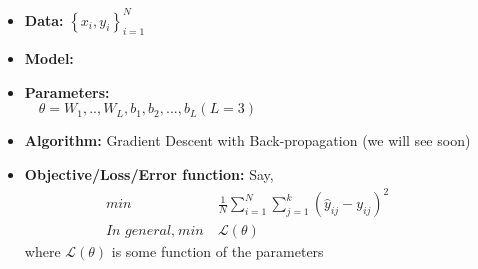 \begin{frame}
  \begin{columns}
    \begin{overlayarea}{\textwidth}{\textheight}
      \makebox[\textwidth][c]{\usebox{\nncontent}}
    \end{overlayarea}

      \begin{itemize}
        \justifying
        \item <1-> \textbf{Data:} $\left\{ x_{i},y_{i} \right\}_{i=1}^{N}$
        \item <2-> \textbf{Model:} 
            \vspace{-0.1in}
        \item <4-> \textbf{Parameters:} \\ $\quad \theta = {W_{1}, .., W_{L}, b_1, b_2, ... , b_L} (L =3)$
        \item <5-> \textbf{Algorithm:} Gradient Descent with Back-propagation (we will see soon)
        \item <6-> \textbf{Objective/Loss/Error function:} Say,
            \vspace{-0.1in}
            \begin{align*}
              min                        & ~ \frac{1}{N} \sum_{i=1}^{N} \sum_{j=1}^{k} (\hat y_{ij} - y_{ij})^{2} \\
              \textit{In general,} ~ min & ~ \mathscr{L}(\theta)
            \end{align*}
            where $\mathscr{L}(\theta)$ is some function of the parameters
      \end{itemize}
  \end{columns}
\end{frame}
